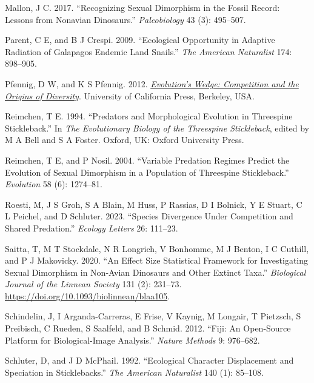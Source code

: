 \documentclass[
  12pt,
]{article}
\newlength{\cslhangindent}
\newlength{\cslentryspacingunit} %
\newenvironment{CSLReferences}[2] %
 {%
  \setlength{\parindent}{0pt}
  \ifodd #1
  \let\oldpar\par
  \def\par{\hangindent=\cslhangindent\oldpar}
  \fi
  \setlength{\parskip}{#2\cslentryspacingunit}
 }%
 {}
\begin{document}
\begin{CSLReferences}{1}{0}
\leavevmode{}%
Mallon, J C. 2017. {``Recognizing Sexual Dimorphism in the Fossil
Record: Lessons from Nonavian Dinosaurs.''} \emph{Paleobiology} 43 (3):
495--507.

\leavevmode{}%
Parent, C E, and B J Crespi. 2009. {``Ecological Opportunity in Adaptive
Radiation of Galapagos Endemic Land Snails.''} \emph{The American
Naturalist} 174: 898--905.

\leavevmode{}%
Pfennig, D W, and K S Pfennig. 2012. \emph{\href{}{Evolution's Wedge:
Competition and the Origins of Diversity}}. University of California
Press, Berkeley, USA.

\leavevmode{}%
Reimchen, T E. 1994. {``Predators and Morphological Evolution in
Threespine Stickleback.''} In \emph{The Evolutionary Biology of the
Threespine Stickleback}, edited by M A Bell and S A Foster. Oxford, UK:
Oxford University Press.

\leavevmode{}%
Reimchen, T E, and P Nosil. 2004. {``Variable Predation Regimes Predict
the Evolution of Sexual Dimorphism in a Population of Threespine
Stickleback.''} \emph{Evolution} 58 (6): 1274--81.

\leavevmode{}%
Roesti, M, J S Groh, S A Blain, M Huss, P Rassias, D I Bolnick, Y E
Stuart, C L Peichel, and D Schluter. 2023. {``Species Divergence Under
Competition and Shared Predation.''} \emph{Ecology Letters} 26: 111--23.

\leavevmode{}%
Saitta, T, M T Stockdale, N R Longrich, V Bonhomme, M J Benton, I C
Cuthill, and P J Makovicky. 2020. {``An Effect Size Statistical
Framework for Investigating Sexual Dimorphism in Non-Avian Dinosaurs and
Other Extinct Taxa.''} \emph{Biological Journal of the Linnean Society}
131 (2): 231--73. \url{https://doi.org/10.1093/biolinnean/blaa105}.

\leavevmode{}%
Schindelin, J, I Arganda-Carreras, E Frise, V Kaynig, M Longair, T
Pietzsch, S Preibisch, C Rueden, S Saalfeld, and B Schmid. 2012.
{``Fiji: An Open-Source Platform for Biological-Image Analysis.''}
\emph{Nature Methods} 9: 976--682.

\leavevmode{}%
Schluter, D, and J D McPhail. 1992. {``Ecological Character Displacement
and Speciation in Sticklebacks.''} \emph{The American Naturalist} 140
(1): 85--108.


\end{CSLReferences}
\end{document}
